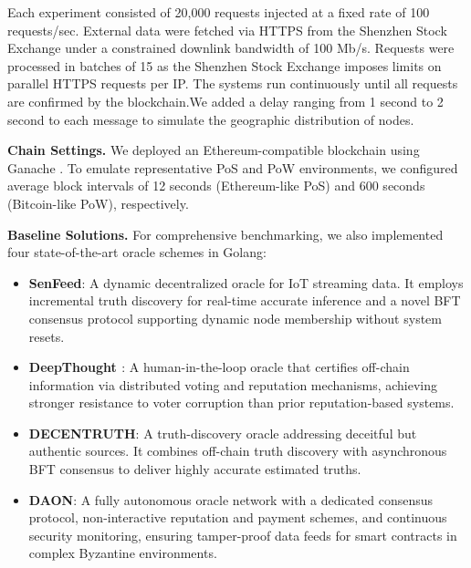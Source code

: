\documentclass[journal]{IEEEtran}
\begin{document}
Each experiment consisted of 20,000 requests injected at a fixed rate of 100 requests/sec. External data were fetched via HTTPS from the Shenzhen Stock Exchange\cite{SZSE_Homepage} under a constrained downlink bandwidth of 100 Mb/s. Requests were processed in batches of 15 as the Shenzhen Stock Exchange\cite{SZSE_Homepage} imposes limits on parallel HTTPS requests per IP. The systems run continuously until all requests are confirmed by the blockchain.We added a delay ranging from 1 second to 2 second to each message to simulate the geographic
distribution of nodes.

\textbf{Chain Settings.} We deployed an Ethereum-compatible blockchain using Ganache \cite{Ganachesoftware}. To emulate representative PoS and PoW environments, we configured average block intervals of 12 seconds (Ethereum-like PoS) and 600 seconds (Bitcoin-like PoW), respectively.

\textbf{Baseline Solutions.} For comprehensive benchmarking, we also implemented four state-of-the-art oracle schemes in Golang:

\begin{itemize}
    \item \textbf{SenFeed\cite{infocom2025seenfeed}}: A dynamic decentralized oracle for IoT streaming data. It employs incremental truth discovery for real-time accurate inference and a novel BFT consensus protocol supporting dynamic node membership without system resets.
    
    \item \textbf{DeepThought \cite{DiGennaro2022DeepThought}}: A human-in-the-loop oracle that certifies off-chain information via distributed voting and reputation mechanisms, achieving stronger resistance to voter corruption than prior reputation-based systems.
    
    \item \textbf{DECENTRUTH\cite{infocomdecentruth}}: A truth-discovery oracle addressing deceitful but authentic sources. It combines off-chain truth discovery with asynchronous BFT consensus to deliver highly accurate estimated truths.
    
    \item \textbf{DAON\cite{infocom2023daon}}: A fully autonomous oracle network with a dedicated consensus protocol, non-interactive reputation and payment schemes, and continuous security monitoring, ensuring tamper-proof data feeds for smart contracts in complex Byzantine environments.
\end{itemize}
\end{document}

